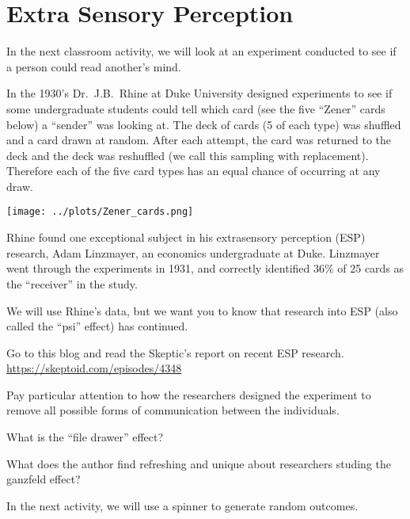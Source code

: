 \def\theTopic{Reading 4}


\section { Extra Sensory Perception}


In the next classroom activity, we will look at an experiment conducted to see
if a person could read another's mind. 

 In the 1930's Dr.~J.B.~Rhine at Duke University designed experiments
to see if some undergraduate students could tell which card (see the
five ``Zener'' cards below) a ``sender'' was looking at. The deck of
cards (5 of each type) was shuffled and a card drawn at random. After
each attempt, the card was returned to the deck and the deck was
reshuffled (we call this sampling with replacement).  Therefore each
of the five card types has an equal chance of occurring at any draw.
\begin{center}
  \texttt{[image: ../plots/Zener\_cards.png]}
\end{center}

 Rhine found one exceptional subject in his extrasensory perception
 (ESP) research, Adam Linzmayer, an economics undergraduate at Duke.
 Linzmayer went through the experiments in 1931, and correctly
 identified 36\% of 25 cards as the ``receiver'' in the study. 

We will use Rhine's data, but we want you to know that research into ESP
(also called the ``psi'' effect) has continued.

  Go to this blog and read the Skeptic's report on recent ESP
  research.\\
  \url{https://skeptoid.com/episodes/4348}\vspace{1cm}


  Pay particular attention to how the researchers designed the
  experiment to remove all possible forms of communication between the
  individuals.  \vspace{1cm}


  What is the ``file drawer'' effect?\vspace{1cm}

  What does the author find refreshing and unique about researchers
  studing the ganzfeld effect?\vspace{1cm}



\newpage

In the next activity, we will use a spinner to generate random outcomes. 

